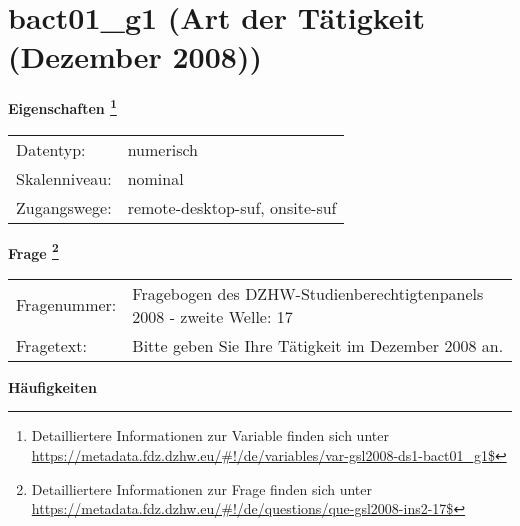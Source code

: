 
    \setcounter{footnote}{0}

    \vspace*{-1.8cm}
	\section{bact01\_g1 (Art der Tätigkeit (Dezember 2008))}
	\label{section:bact01_g1}



    \vspace*{0.5cm}
    \noindent\textbf{Eigenschaften
	\footnote{Detailliertere Informationen zur Variable finden sich unter
		\url{https://metadata.fdz.dzhw.eu/\#!/de/variables/var-gsl2008-ds1-bact01_g1$}}}\\
	\begin{tabularx}{\hsize}{@{}lX}
	Datentyp: & numerisch \\
	Skalenniveau: & nominal \\
	Zugangswege: &
	  remote-desktop-suf, 
	  onsite-suf
 \\
    \end{tabularx}



				\vspace*{0.5cm}
                \noindent\textbf{Frage
	                \footnote{Detailliertere Informationen zur Frage finden sich unter
		              \url{https://metadata.fdz.dzhw.eu/\#!/de/questions/que-gsl2008-ins2-17$}}}\\
				\begin{tabularx}{\hsize}{@{}lX}
					Fragenummer: &
					  Fragebogen des DZHW-Studienberechtigtenpanels 2008 - zweite Welle:
					  17
 \\
					Fragetext: & Bitte geben Sie Ihre Tätigkeit im Dezember 2008 an. \\
				\end{tabularx}





        		\vspace*{0.5cm}
                \noindent\textbf{Häufigkeiten}

